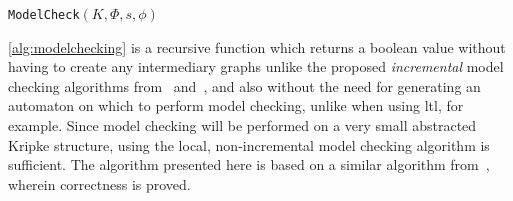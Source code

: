 \begin{algorithm}
\caption{\texttt{ModelCheck}$(K, \Phi, s, \phi)$}
\label{alg:modelchecking}
\begin{algorithmic}[1]
    \Switch{$\phi$}
        \EndCase{}
        \EndCase{}
        \EndCase{}
        \EndCase{}
        \Case{$\psi \lor \varphi$}
        \EndCase{}
        \Case{$\Diamond \varphi$}
                \EndIf{}
            \EndFor{}
        \EndCase{}
        \EndCase{}
                    \EndCase{}
                    \EndCase{}
                \EndSwitch{}
            \Else{}
            \EndIf{}
        \EndCase{}
    \EndSwitch{}
\end{algorithmic}{}
\end{algorithm}

\autoref{alg:modelchecking} is a recursive function which returns a boolean value without having to create any intermediary graphs unlike the proposed {\em incremental\/} model checking algorithms from~\cite{Emerson1999} and~\cite{Karaman2009}, and also without the need for generating an automaton on which to perform model checking, unlike when using \gls{ltl}, for example. Since model checking will be performed on a very small abstracted Kripke structure, using the local, non-incremental model checking algorithm is sufficient. The algorithm presented here is based on a similar algorithm from~\cite{Schneider2004}, wherein correctness is proved.


